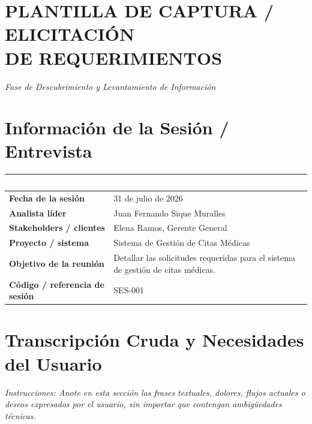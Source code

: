 \section*{PLANTILLA DE CAPTURA / ELICITACIÓN\\DE REQUERIMIENTOS}
\begin{center}
\textit{Fase de Descubrimiento y Levantamiento de Información}
\end{center}

\section{Información de la Sesión / Entrevista}

\begin{tabularx}{\textwidth}{>{\bfseries}p{}X}
\toprule
\rowcolor{azulprincipal}\textcolor{white}{Campo} & \textcolor{white}{Detalle / Registro del Analista}\\
\midrule
Fecha de la sesión & 31 de julio de 2026\\
Analista líder & Juan Fernando Sique Muralles\\
Stakeholders / clientes & Elena Ramos, Gerente General\\
Proyecto / sistema & Sistema de Gestión de Citas Médicas\\
Objetivo de la reunión & Detallar las solicitudes requeridas para el sistema de gestión de citas médicas.\\
Código / referencia de sesión & SES-001\\
\bottomrule
\end{tabularx}

\section{Transcripción Cruda y Necesidades del Usuario}

\textit{Instrucciones: Anote en esta sección las frases textuales, dolores, flujos actuales o deseos expresados por el usuario, sin importar que contengan ambigüedades técnicas.}

